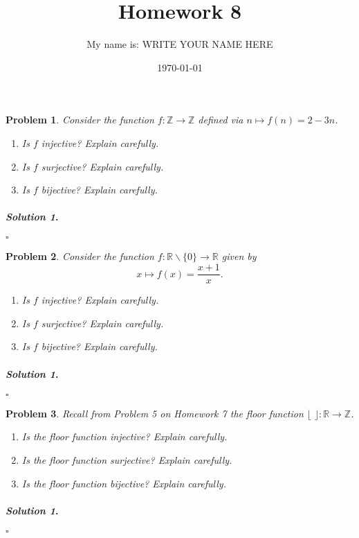 \documentclass{amsart}
\theoremstyle{plain}
\newtheorem{problem}{Problem}
\newenvironment{solution}{\paragraph{\emph{Solution 1}.}}{\hfill$\square$}
\begin{document}
 

\title[Homework 8]{Homework 8}
\author{My name is:  WRITE YOUR NAME HERE}  %
\date{\today} 
\maketitle 

\begin{problem}
Consider the function $f:\mathbb{Z} \rightarrow \mathbb{Z}$ defined via $n \mapsto f(n) = 2 - 3n$.
\begin{enumerate}
\item Is $f$ injective?  Explain carefully.
\item Is $f$ surjective?  Explain carefully.
\item Is $f$ bijective?  Explain carefully.
\end{enumerate}
\end{problem}
\begin{solution}
\end{solution}

\begin{problem}
Consider the function $f:\mathbb{R} \smallsetminus \{ 0\} \rightarrow \mathbb{R}$ given by 
$$x \mapsto f(x) = \frac{x+1}{x}. $$
\begin{enumerate}
\item Is $f$ injective?  Explain carefully.
\item Is $f$ surjective?  Explain carefully.
\item Is $f$ bijective?  Explain carefully.
\end{enumerate}
\end{problem}
\begin{solution}
\end{solution}

\begin{problem}
Recall from Problem 5 on Homework 7 the floor function $\lfloor \, \, \rfloor:\mathbb{R} \rightarrow \mathbb{Z}$.
\begin{enumerate}
\item Is the floor function injective?  Explain carefully.
\item Is the floor function surjective?  Explain carefully.
\item Is the floor function bijective?  Explain carefully.
\end{enumerate}
\end{problem}
\begin{solution}
\end{solution}
\end{document}
